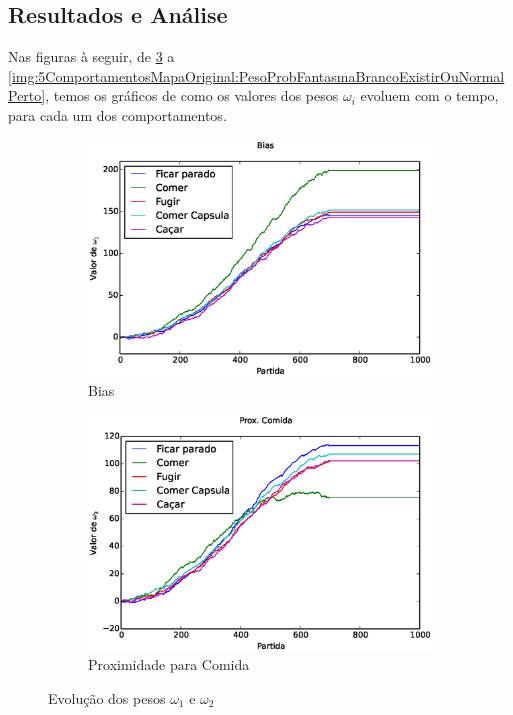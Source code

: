 \subsection{Resultados e Análise}

Nas figuras à seguir, de \ref{img:5ComportamentosMapaOriginal:PesoBiasAndDistComida} a \ref{img:5ComportamentosMapaOriginal:PesoProbFantasmaBrancoExistirOuNormalPerto}, temos os gráficos de como os valores dos pesos $ \omega_i $ evoluem com o tempo, para cada um dos comportamentos.

\begin{figure}[H]
	\centering
	\begin{subfigure}[t]{.5\textwidth}
		\centering
		\includegraphics[width=\linewidth]{images/5_behaviors_original_map/weights____pol__Bias}
		\caption{Bias}
		\label{img:5ComportamentosMapaOriginal:PesoBias}
	\end{subfigure}%
	\begin{subfigure}[t]{.5\textwidth}
		\centering
		\includegraphics[width=\linewidth]{images/5_behaviors_original_map/weights____pol__DistComida}
		\caption{Proximidade para Comida}
		\label{img:5ComportamentosMapaOriginal:PesoDistComida}
	\end{subfigure}
	\caption{Evolução dos pesos $ \omega_1 $ e $ \omega_2 $}
	\label{img:5ComportamentosMapaOriginal:PesoBiasAndDistComida}
\end{figure}

